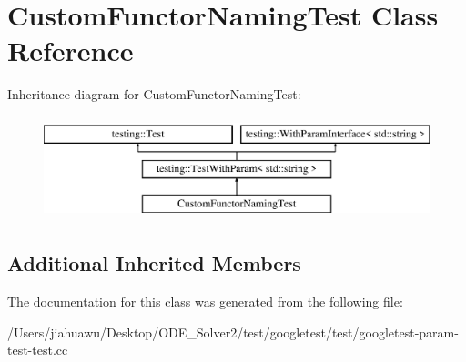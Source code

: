 \hypertarget{class_custom_functor_naming_test}{}\section{Custom\+Functor\+Naming\+Test Class Reference}
\label{class_custom_functor_naming_test}
Inheritance diagram for Custom\+Functor\+Naming\+Test\+:\begin{figure}[H]
\begin{center}
\leavevmode
\includegraphics[height=3.000000cm]{class_custom_functor_naming_test}
\end{center}
\end{figure}
\subsection*{Additional Inherited Members}


The documentation for this class was generated from the following file\+:\begin{DoxyCompactItemize}
\item 
/\+Users/jiahuawu/\+Desktop/\+O\+D\+E\+\_\+\+Solver2/test/googletest/test/googletest-\/param-\/test-\/test.\+cc\end{DoxyCompactItemize}
